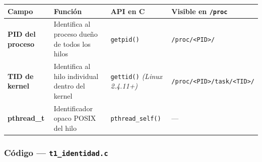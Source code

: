 \documentclass[
  spanish,
]{article}
\newcounter{none} %
\begin{document}
{\def\LTcaptype{none} %
\begin{longtable}[]{@{}
  >{\raggedright\arraybackslash}p{}
  >{\raggedright\arraybackslash}p{}
  >{\raggedright\arraybackslash}p{}
  >{\raggedright\arraybackslash}p{}@{}}
\toprule\noalign{}
\begin{minipage}[b]{\linewidth}\raggedright
Campo
\end{minipage} & \begin{minipage}[b]{\linewidth}\raggedright
Función
\end{minipage} & \begin{minipage}[b]{\linewidth}\raggedright
API en C
\end{minipage} & \begin{minipage}[b]{\linewidth}\raggedright
Visible en \texttt{/proc}
\end{minipage} \\
\midrule\noalign{}
\endhead
\bottomrule\noalign{}
\endlastfoot
\textbf{PID del proceso} & Identifica al proceso dueño de todos los
hilos & \texttt{getpid()} &
\texttt{/proc/\textless{}PID\textgreater{}/} \\
\textbf{TID de kernel} & Identifica al hilo individual dentro del kernel
& \texttt{gettid()} \emph{(Linux 2.4.11+)} &
\texttt{/proc/\textless{}PID\textgreater{}/task/\textless{}TID\textgreater{}/} \\
\textbf{pthread\_t} & Identificador opaco POSIX del hilo &
\texttt{pthread\_self()} & --- \\
\end{longtable}
}

\subsubsection{\texorpdfstring{Código ---
\texttt{t1\_identidad.c}}{Código --- t1\_identidad.c}}\label{cuxf3digo-t1_identidad.c}
\end{document}
